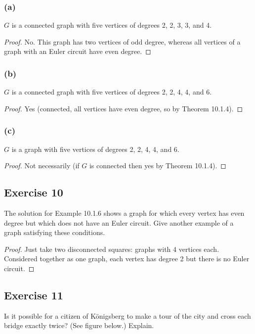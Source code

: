 \documentclass[14pt]{extarticle}
\begin{document}
\subsubsection{(a)}
\(G\) is a connected graph with five vertices of degrees 2, 2, 3, 3, and 4.
\begin{proof}
    No. This graph has two vertices of odd degree, whereas all vertices of a graph with an Euler circuit have even degree.
\end{proof}

\subsubsection{(b)}
\(G\) is a connected graph with five vertices of degrees 2, 2, 4, 4, and 6.
\begin{proof}
    Yes (connected, all vertices have even degree, so by Theorem 10.1.4).
\end{proof}

\subsubsection{(c)}
\(G\) is a graph with five vertices of degrees 2, 2, 4, 4, and 6.
\begin{proof}
    Not necessarily (if \(G\) is connected then yes by Theorem 10.1.4).
\end{proof}

\subsection{Exercise 10}
The solution for Example 10.1.6 shows a graph for which every vertex has even degree but which does not have an Euler
circuit. Give another example of a graph satisfying these conditions.

\begin{proof}
    Just take two disconnected squares: graphs with 4 vertices each. Considered together as one graph, each vertex has degree
    2 but there is no Euler circuit.
\end{proof}

\subsection{Exercise 11}
Is it possible for a citizen of Königsberg to make a tour of the city and cross each bridge exactly twice? (See figure
below.) Explain.
\end{document}
